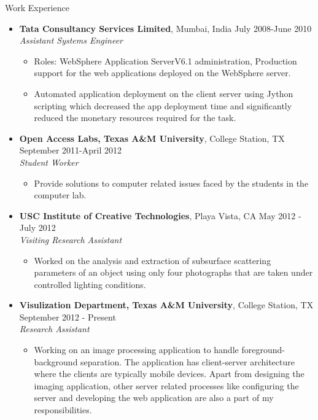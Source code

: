 \documentclass[11pt,oneside]{article}
\newenvironment{ressection}[1]{
  \vspace{4pt}
  {\fontfamily{phv}\selectfont\Large#1}
  \begin{itemize}
  \vspace{3pt}
}{
  \end{itemize}
}
\newcommand{\ressubitem}[1]{
  \vspace{-1pt}
  \item \begin{flushleft} #1 \end{flushleft}
}
\newcommand{\resbigitem}[4]{
  \vspace{-5pt}
  \item
  \textbf{#1}, #2 \hfill #4\\
  \textit{#3}
}
\newenvironment{ressubsec}[4]{
  \resbigitem{#1}{#2}{#3}{#4}
  \vspace{-2pt}
  \begin{itemize}
}{
  \end{itemize}
}
\begin{document}
\begin{ressection}{Work Experience}

  \begin{ressubsec}{Tata Consultancy Services Limited}{Mumbai, India}{Assistant Systems Engineer}{July 2008-June 2010}
  		\ressubitem{Roles: WebSphere Application ServerV6.1 administration, Production support for the web applications deployed on the WebSphere server.}
  		\ressubitem{Automated application deployment on the client server using Jython scripting which decreased the app deployment time and significantly reduced the monetary resources required for the task.}
  \end{ressubsec}
  
    \begin{ressubsec}{Open Access Labs, Texas A\&M University}{College Station, TX}{Student Worker}{September 2011-April 2012}
    		\ressubitem{Provide solutions to computer related issues faced by the students in the computer lab.}
    \end{ressubsec}
  
     \begin{ressubsec}{USC Institute of Creative Technologies}{Playa Vista, CA}{Visiting Research Assistant}{May 2012 - July 2012}
       	\ressubitem{Worked on the analysis and extraction of subsurface scattering parameters of an object using only four photographs that are taken under controlled lighting conditions.}
     \end{ressubsec}
  
    \begin{ressubsec}{Visulization Department, Texas A\&M University}{College Station, TX}{Research Assistant}{September 2012 - Present}
    		\ressubitem{Working on an image processing application to handle foreground-background separation. The application has client-server architecture where the clients are typically mobile devices. Apart from designing the imaging application, other server related processes like configuring the server and developing the web application are also a part of my responsibilities.}
    \end{ressubsec}

\end{ressection}
\end{document}
